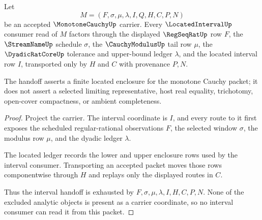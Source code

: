 \begin{theorem}
\label{thm:monotone-cauchy-located-interval-handoff}
Let
$$
M=(F,\sigma,\mu,\lambda,I,Q,H,C,P,N)
$$
be an accepted $\MonotoneCauchyUp$ carrier. Every $\LocatedIntervalUp$ consumer read of $M$ factors through the displayed $\RegSeqRatUp$ row $F$, the $\StreamNameUp$ schedule $\sigma$, the $\CauchyModulusUp$ tail row $\mu$, the $\DyadicRatCoreUp$ tolerance and upper-bound ledger $\lambda$, and the located interval row $I$, transported only by $H$ and $C$ with provenance $P,N$.

The handoff asserts a finite located enclosure for the monotone Cauchy packet; it does not assert a selected limiting representative, host real equality, trichotomy, open-cover compactness, or ambient completeness.
\end{theorem}
\begin{proof}
Project the carrier. The interval coordinate is $I$, and every route to it first exposes the scheduled regular-rational observations $F$, the selected window $\sigma$, the modulus row $\mu$, and the dyadic ledger $\lambda$.

The located ledger records the lower and upper enclosure rows used by the interval consumer. Transporting an accepted packet moves those rows componentwise through $H$ and replays only the displayed routes in $C$.

Thus the interval handoff is exhausted by $F,\sigma,\mu,\lambda,I,H,C,P,N$. None of the excluded analytic objects is present as a carrier coordinate, so no interval consumer can read it from this packet.
\end{proof}

